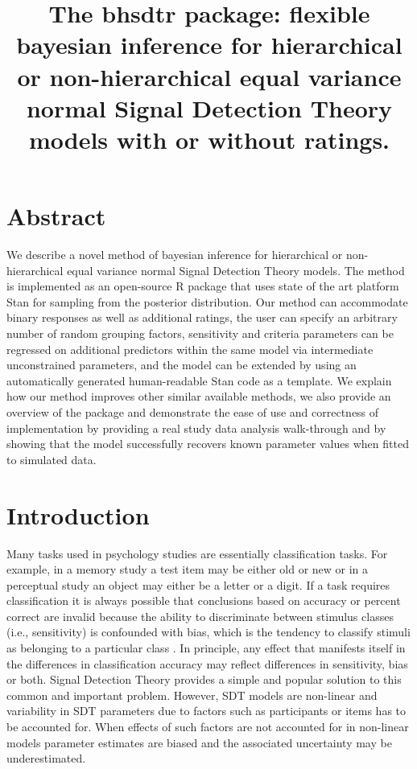 \documentclass[oneside,a4paper]{article}
\title{The bhsdtr package: flexible bayesian inference for
  hierarchical or non-hierarchical equal variance normal Signal
  Detection Theory models with or without ratings.}
\begin{document}
\maketitle
\tableofcontents{}

\section{Abstract}

We describe a novel method of bayesian inference for hierarchical or
non-hierarchical equal variance normal Signal Detection Theory
models. The method is implemented as an open-source R package that
uses state of the art platform Stan for sampling from the posterior
distribution. Our method can accommodate binary responses as well as
additional ratings, the user can specify an arbitrary number of random
grouping factors, sensitivity and criteria parameters can be regressed
on additional predictors within the same model via intermediate
unconstrained parameters, and the model can be extended by using an
automatically generated human-readable Stan code as a template. We
explain how our method improves other similar available methods, we
also provide an overview of the package and demonstrate the ease of
use and correctness of implementation by providing a real study data
analysis walk-through and by showing that the model successfully
recovers known parameter values when fitted to simulated data.

\section{Introduction}

Many tasks used in psychology studies are essentially classification
tasks. For example, in a memory study a test item may be either old or
new or in a perceptual study an object may either be a letter or a
digit. If a task requires classification it is always possible that
conclusions based on accuracy or percent correct are invalid because
the ability to discriminate between stimulus classes (i.e.,
sensitivity) is confounded with bias, which is the tendency to
classify stimuli as belonging to a particular class
\cite{GreenSwets66}. In principle, any effect that manifests itself in
the differences in classification accuracy may reflect differences in
sensitivity, bias or both. Signal Detection Theory provides a simple
and popular solution to this common and important problem. However,
SDT models are non-linear and variability in SDT parameters due to
factors such as participants or items has to be accounted for. When
effects of such factors are not accounted for in non-linear models
parameter estimates are biased and the associated uncertainty may be
underestimated.
\end{document}
